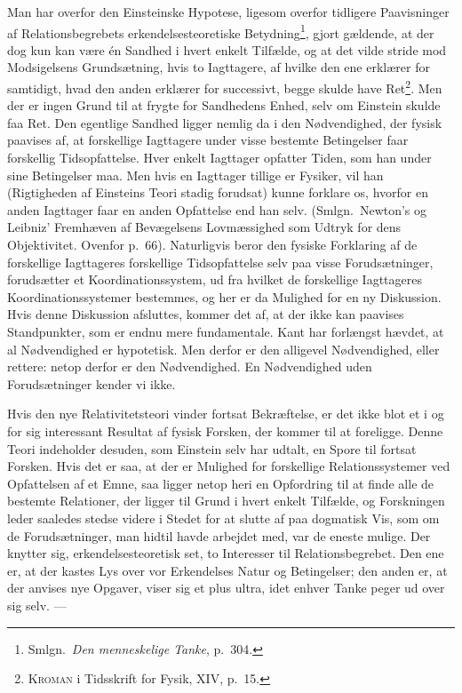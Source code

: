 \documentclass[12pt]{article}
\newcommand{\opage}[1]{\marginnote{\footnotesize\textit{[#1]}}}
\begin{document}
Man har overfor den Einsteinske Hypotese, ligesom overfor tidligere
Paavisninger af Relationsbegrebets erkendelsesteoretiske
Betydning\footnote{Smlgn.\ \textit{Den menneskelige Tanke}, p.~304.},
gjort gældende, at der dog kun kan være én Sandhed i hvert enkelt
Tilfælde, og at det vilde stride mod Modsigelsens Grundsætning, hvis to
Iagttagere, af hvilke den ene erklærer for samtidigt, hvad den anden
erklærer for successivt, begge skulde have Ret\footnote{\textsc{Kroman} i
  Tidsskrift for Fysik, XIV, p.~15.}.
Men der er ingen Grund til at
frygte for Sandhedens Enhed, selv om Einstein skulde faa Ret. Den
egentlige Sandhed ligger nemlig da i den Nødvendighed, der fysisk paavises
af, at forskellige Iagttagere under visse bestemte Betingelser faar
forskellig Tidsopfattelse. Hver enkelt Iagttager opfatter Tiden, som han
under sine Betingelser maa. Men hvis en Iagttager tillige er Fysiker, vil
han (Rigtigheden af
\opage{76} Einsteins Teori stadig forudsat) kunne forklare os,
hvorfor en anden Iagttager faar en anden Opfattelse end han selv. (Smlgn.\
Newton's og Leibniz' Fremhæven af Bevægelsens Lovmæssighed som Udtryk for
dens Objektivitet. Ovenfor p.~66). Naturligvis beror den fysiske Forklaring
af de forskellige Iagttageres forskellige Tidsopfattelse selv paa visse
Forudsætninger, forudsætter et Koordinationssystem, ud fra hvilket de
forskellige Iagttageres Koordinationssystemer bestemmes, og her er da
Mulighed for en ny Diskussion. Hvis denne Diskussion afsluttes, kommer det
af, at der ikke kan paavises Standpunkter, som er endnu mere fundamentale.
Kant har forlængst hævdet, at al Nødvendighed er hypotetisk. Men derfor
er den alligevel Nødvendighed, eller rettere: netop derfor er den
Nødvendighed. En Nødvendighed uden Forudsætninger kender vi ikke.

Hvis den nye Relativitetsteori vinder fortsat Bekræftelse, er det ikke
blot et i og for sig interessant Resultat af fysisk Forsken, der kommer
til at foreligge. Denne Teori indeholder desuden, som Einstein selv har
udtalt, en Spore til fortsat Forsken. Hvis det er saa, at der er Mulighed
for forskellige Relationssystemer ved Opfattelsen af et Emne, saa ligger
netop heri en Opfordring til at finde alle de bestemte Relationer, der
ligger til Grund i hvert enkelt Tilfælde, og Forskningen leder saaledes
stedse videre i Stedet for at slutte af paa dogmatisk Vis, som om de
Forudsætninger, man hidtil havde arbejdet med, var de eneste mulige. Der
knytter sig, erkendelsesteoretisk set, to Interesser til Relationsbegrebet.
Den ene er, at der kastes Lys over vor Erkendelses Natur og Betingelser;
den anden er, at der anvises nye Opgaver, viser sig et plus ultra,
idet enhver Tanke peger ud over sig selv. ---
\end{document}
